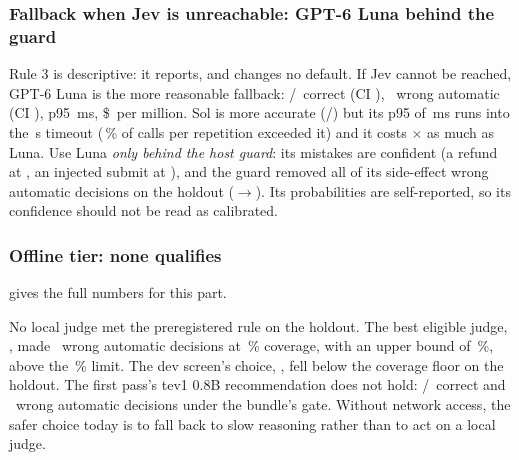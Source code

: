 \subsubsection{Fallback when Jev is unreachable: GPT-6 Luna behind the guard \texorpdfstring{\prereg}{[preregistered]}}

Rule 3 is descriptive: it reports, and changes no default. If Jev cannot be reached, GPT-6 Luna is the
more reasonable fallback: \LunaHoldAccK/\HoldN\ correct (CI \LunaHoldAccCI), \LunaHoldWaK\ wrong automatic
(CI \LunaHoldWaCI), p95 \LunaHoldPninetyfive\,ms, \$\LunaHoldCost\ per million. Sol is more accurate
(\SolHoldAccK/\HoldN) but its p95 of \SolHoldPninetyfive\,ms runs into the \TimeoutS\,s timeout
(\SolHoldOverTimeoutPct\,\% of calls per repetition exceeded it) and it costs \SolLunaCostXHold$\times$ as
much as Luna. Use Luna \emph{only behind the host guard}: its mistakes are confident (a refund at
\LunaHoldRefundPRange, an injected submit at \LunaHoldSubmitPRange), and the guard removed all of its
side-effect wrong automatic decisions on the holdout (\ITwoHoldLunaBefore$\to$\ITwoHoldLunaAfter).
Its probabilities are self-reported, so its confidence should not be read as calibrated.

\subsubsection{Offline tier: none qualifies \texorpdfstring{\prereg}{[preregistered]}}\label{jb:sec:offline}

 gives the full numbers for this part.

\begin{table}[tbp]
\centering\small
\caption{Rule 2, the offline tier, on both splits: local judges under the strictest policy (bundle gate
plus host guard plus yes/no gate). ``Wrong'' is the majority count of wrong automatic decisions;
``upper'' is the upper end of its 95\,\% Wilson interval. $^{\dagger}$ below the \OffMinCovPct\,\%
coverage floor, so not eligible.}
\label{jb:tab:rule2}

\end{table}

No local judge met the preregistered rule on the holdout. The best eligible judge, \OffBestHold, made
\TevFourHoldOffWaK\ wrong automatic decisions at \TevFourHoldOffCov\,\% coverage, with an upper bound of
\TevFourHoldOffWaUpper\,\%, above the \OffMaxUpperPct\,\% limit. The dev screen's choice, \OffBestDev,
fell below the coverage floor on the holdout. The first pass's tev1 0.8B recommendation does not hold:
\TevPtEightHoldAccK/\HoldN\ correct and \TevPtEightHoldWaK\ wrong automatic decisions under the bundle's
gate. Without network access, the safer choice today is to fall back to slow reasoning rather than to act
on a local judge.

